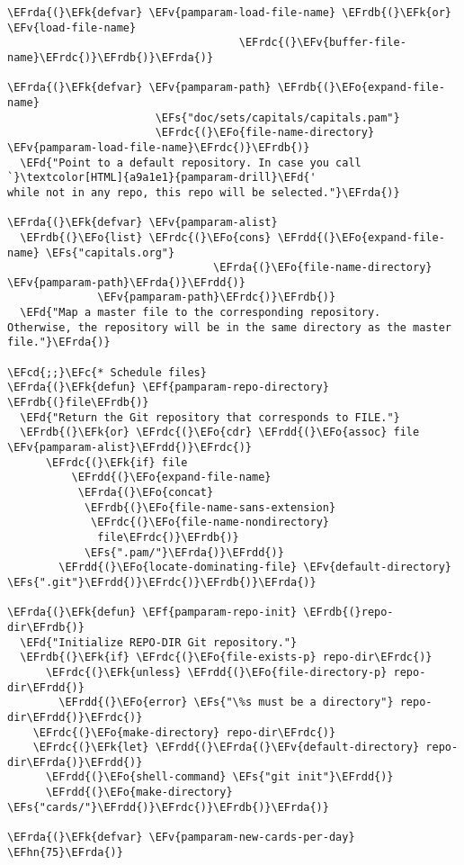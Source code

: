 \documentclass[a4wide,10pt]{article}
\newcommand{\EFc}[1]{\textcolor{EFc}{#1}} %
\newcommand{\EFcd}[1]{\textcolor{EFcd}{#1}} %
\newcommand{\EFs}[1]{\textcolor{EFs}{#1}} %
\newcommand{\EFd}[1]{\textcolor{EFd}{#1}} %
\newcommand{\EFk}[1]{\textcolor{EFk}{#1}} %
\newcommand{\EFf}[1]{\textcolor{EFf}{#1}} %
\newcommand{\EFv}[1]{\textcolor{EFv}{#1}} %
\newcommand{\EFo}[1]{\textcolor{EFo}{#1}} %
\newcommand{\EFhn}[1]{\textcolor{EFhn}{\textbf{#1}}} %
\newcommand{\EFrda}[1]{\textcolor{EFrda}{#1}} %
\newcommand{\EFrdb}[1]{\textcolor{EFrdb}{#1}} %
\newcommand{\EFrdc}[1]{\textcolor{EFrdc}{#1}} %
\newcommand{\EFrdd}[1]{\textcolor{EFrdd}{#1}} %
\begin{document}
\begin{Code}
\begin{Verbatim}
\EFrda{(}\EFk{defvar} \EFv{pamparam-load-file-name} \EFrdb{(}\EFk{or} \EFv{load-file-name}
                                    \EFrdc{(}\EFv{buffer-file-name}\EFrdc{)}\EFrdb{)}\EFrda{)}

\EFrda{(}\EFk{defvar} \EFv{pamparam-path} \EFrdb{(}\EFo{expand-file-name}
                       \EFs{"doc/sets/capitals/capitals.pam"}
                       \EFrdc{(}\EFo{file-name-directory} \EFv{pamparam-load-file-name}\EFrdc{)}\EFrdb{)}
  \EFd{"Point to a default repository. In case you call `}\textcolor[HTML]{a9a1e1}{pamparam-drill}\EFd{'
while not in any repo, this repo will be selected."}\EFrda{)}

\EFrda{(}\EFk{defvar} \EFv{pamparam-alist}
  \EFrdb{(}\EFo{list} \EFrdc{(}\EFo{cons} \EFrdd{(}\EFo{expand-file-name} \EFs{"capitals.org"}
                                \EFrda{(}\EFo{file-name-directory} \EFv{pamparam-path}\EFrda{)}\EFrdd{)}
              \EFv{pamparam-path}\EFrdc{)}\EFrdb{)}
  \EFd{"Map a master file to the corresponding repository.
Otherwise, the repository will be in the same directory as the master file."}\EFrda{)}

\EFcd{;;}\EFc{* Schedule files}
\EFrda{(}\EFk{defun} \EFf{pamparam-repo-directory} \EFrdb{(}file\EFrdb{)}
  \EFd{"Return the Git repository that corresponds to FILE."}
  \EFrdb{(}\EFk{or} \EFrdc{(}\EFo{cdr} \EFrdd{(}\EFo{assoc} file \EFv{pamparam-alist}\EFrdd{)}\EFrdc{)}
      \EFrdc{(}\EFk{if} file
          \EFrdd{(}\EFo{expand-file-name}
           \EFrda{(}\EFo{concat}
            \EFrdb{(}\EFo{file-name-sans-extension}
             \EFrdc{(}\EFo{file-name-nondirectory}
              file\EFrdc{)}\EFrdb{)}
            \EFs{".pam/"}\EFrda{)}\EFrdd{)}
        \EFrdd{(}\EFo{locate-dominating-file} \EFv{default-directory} \EFs{".git"}\EFrdd{)}\EFrdc{)}\EFrdb{)}\EFrda{)}

\EFrda{(}\EFk{defun} \EFf{pamparam-repo-init} \EFrdb{(}repo-dir\EFrdb{)}
  \EFd{"Initialize REPO-DIR Git repository."}
  \EFrdb{(}\EFk{if} \EFrdc{(}\EFo{file-exists-p} repo-dir\EFrdc{)}
      \EFrdc{(}\EFk{unless} \EFrdd{(}\EFo{file-directory-p} repo-dir\EFrdd{)}
        \EFrdd{(}\EFo{error} \EFs{"\%s must be a directory"} repo-dir\EFrdd{)}\EFrdc{)}
    \EFrdc{(}\EFo{make-directory} repo-dir\EFrdc{)}
    \EFrdc{(}\EFk{let} \EFrdd{(}\EFrda{(}\EFv{default-directory} repo-dir\EFrda{)}\EFrdd{)}
      \EFrdd{(}\EFo{shell-command} \EFs{"git init"}\EFrdd{)}
      \EFrdd{(}\EFo{make-directory} \EFs{"cards/"}\EFrdd{)}\EFrdc{)}\EFrdb{)}\EFrda{)}

\EFrda{(}\EFk{defvar} \EFv{pamparam-new-cards-per-day} \EFhn{75}\EFrda{)}


\end{Verbatim}
\end{Code}
\end{document}
